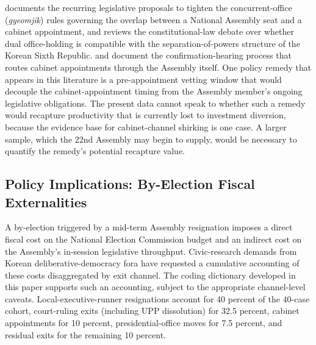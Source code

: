 \documentclass[11pt]{article}
\begin{document}
\citet{leeyj2020} documents the recurring legislative proposals to tighten the concurrent-office (\textit{gyeomjik}) rules governing the overlap between a National Assembly seat and a cabinet appointment, and \citet{oh2019} reviews the constitutional-law debate over whether dual office-holding is compatible with the separation-of-powers structure of the Korean Sixth Republic. \citet{yoon2020} and \citet{shin2016} document the confirmation-hearing process that routes cabinet appointments through the Assembly itself. One policy remedy that appears in this literature is a pre-appointment vetting window that would decouple the cabinet-appointment timing from the Assembly member's ongoing legislative obligations. The present data cannot speak to whether such a remedy would recapture productivity that is currently lost to investment diversion, because the evidence base for cabinet-channel shirking is one case. A larger sample, which the 22nd Assembly may begin to supply, would be necessary to quantify the remedy's potential recapture value.

\subsection{Policy Implications: By-Election Fiscal Externalities}

A by-election triggered by a mid-term Assembly resignation imposes a direct fiscal cost on the National Election Commission budget and an indirect cost on the Assembly's in-session legislative throughput. Civic-research demands from Korean deliberative-democracy fora have requested a cumulative accounting of these costs disaggregated by exit channel. The coding dictionary developed in this paper supports such an accounting, subject to the appropriate channel-level caveats. Local-executive-runner resignations account for 40 percent of the 40-case cohort, court-ruling exits (including UPP dissolution) for 32.5 percent, cabinet appointments for 10 percent, presidential-office moves for 7.5 percent, and residual exits for the remaining 10 percent.
\end{document}
